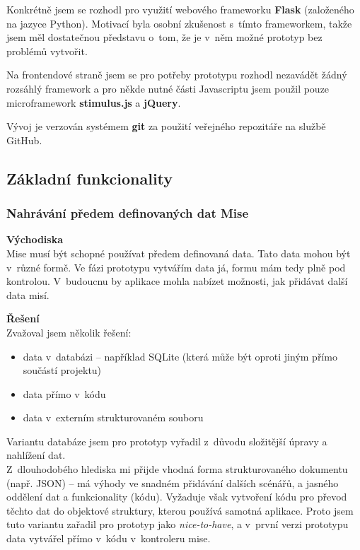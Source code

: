 Konkrétně jsem se rozhodl pro využití webového frameworku \textbf{Flask} (založeného na jazyce Python). Motivací byla osobní zkušenost s~tímto frameworkem, takže jsem měl dostatečnou představu o~tom, že je v~něm možné prototyp bez problémů vytvořit.

Na frontendové straně jsem se pro potřeby prototypu rozhodl nezavádět žádný rozsáhlý framework a pro někde nutné části Javascriptu jsem použil pouze microframework \textbf{stimulus.js} a \textbf{jQuery}.

Vývoj je verzován systémem \textbf{git} za použití veřejného repozitáře na službě GitHub.

\subsection{Základní funkcionality}
\subsubsection*{Nahrávání předem definovaných dat Mise}
	\textbf{Východiska}\\
	Mise musí být schopné používat předem definovaná data. Tato data mohou být v~různé formě. Ve fázi prototypu vytvářím data já, formu mám tedy plně pod kontrolou. V~budoucnu by aplikace mohla nabízet možnosti, jak přidávat další data misí.
	
	\textbf{Řešení}\\
	Zvažoval jsem několik řešení:
	
	\begin{itemize}
		\item data v~databázi -- například SQLite (která může být oproti jiným přímo součástí projektu)
		\item data přímo v~kódu
		\item data v~externím strukturovaném souboru
	\end{itemize}

	Variantu databáze jsem pro prototyp vyřadil z~důvodu složitější úpravy a nahlížení dat. \\
	Z~dlouhodobého hlediska mi přijde vhodná forma strukturovaného dokumentu (např. JSON) -- má výhody ve snadném přidávání dalších scénářů, a jasného oddělení dat a funkcionality (kódu). Vyžaduje však vytvoření kódu pro převod těchto dat do objektové struktury, kterou používá samotná aplikace. Proto jsem tuto variantu zařadil pro prototyp jako \textit{nice-to-have}, a v~první verzi prototypu data vytvářel přímo v~kódu v~kontroleru mise.

